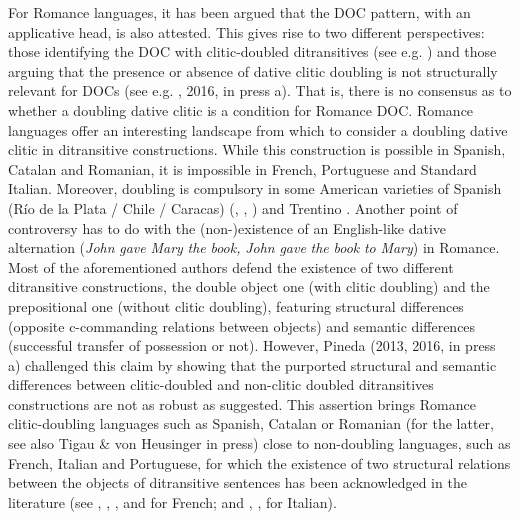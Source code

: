\begin{styleListNumberi}
For Romance languages, it has been argued that the DOC pattern, with an applicative head, is also attested. This gives rise to two different perspectives: those identifying the DOC with clitic-doubled ditransitives (see e.g. \citealt{Cuervo2003}) and those arguing that the presence or absence of dative clitic doubling is not structurally relevant for DOCs (see e.g. \citealt{Pineda2013}, 2016, in press a). That is, there is no consensus as to whether a doubling dative clitic is a  condition for Romance DOC. Romance languages offer an interesting landscape from which to consider a doubling dative clitic in ditransitive constructions. While this construction is possible in Spanish, Catalan and Romanian, it is impossible in French, Portuguese and Standard Italian. Moreover, doubling is compulsory in some American varieties of Spanish (Río de la Plata / Chile / Caracas) (\citealt{Parodi1998}, \citealt{Senn2008}, \citealt{Pujalte2009}) and Trentino \citep{Cordin1993}. Another point of controversy has to do with the (non-)existence of an English-like dative alternation (\textit{John} \textit{gave} \textit{Mary} \textit{the} \textit{book,} \textit{John} \textit{gave} \textit{the} \textit{book} \textit{to} \textit{Mary}) in Romance. Most of the aforementioned authors defend the existence of two different ditransitive constructions, the double object one (with clitic doubling) and the prepositional one (without clitic doubling), featuring structural differences (opposite c-commanding relations between objects) and semantic differences (successful transfer of possession or not). However, Pineda (2013, 2016, in press a) challenged this claim by showing that the purported structural and semantic differences between clitic-doubled and non-clitic doubled ditransitives constructions are not as robust as suggested. This assertion brings Romance clitic-doubling languages such as Spanish, Catalan or Romanian (for the latter, see also Tigau \& von Heusinger in press) close to non-doubling languages, such as French, Italian and Portuguese, for which the existence of two structural relations between the objects of ditransitive sentences has been acknowledged in the literature (see \citealt{Harley2002}, \citealt{Anagnostopoulou2003}, \citealt{Fournier2010}, and \citealt{BonehNash2011} for French; and \citealt{GiorgiLongobardi1991}, \citealt{McGinnis2001}, \citealt{Harley2002} for Italian). 
\end{styleListNumberi}

